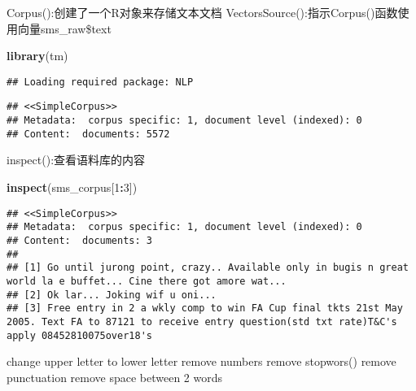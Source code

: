 \documentclass[]{article}
\newenvironment{Shaded}{\begin{snugshade}}{\end{snugshade}}
\newcommand{\KeywordTok}[1]{\textcolor[rgb]{0.13,0.29,0.53}{\textbf{#1}}}
\newcommand{\DecValTok}[1]{\textcolor[rgb]{0.00,0.00,0.81}{#1}}
\newcommand{\StringTok}[1]{\textcolor[rgb]{0.31,0.60,0.02}{#1}}
\newcommand{\OperatorTok}[1]{\textcolor[rgb]{0.81,0.36,0.00}{\textbf{#1}}}
\newcommand{\NormalTok}[1]{#1}
\begin{document}
Corpus():创建了一个R对象来存储文本文档
VectorsSource():指示Corpus()函数使用向量sms\_raw\$text

\begin{Shaded}
\begin{Highlighting}[]
\KeywordTok{library}\NormalTok{(tm)}
\end{Highlighting}
\end{Shaded}

\begin{verbatim}
## Loading required package: NLP
\end{verbatim}

\begin{Shaded}
\end{Shaded}

\begin{verbatim}
## <<SimpleCorpus>>
## Metadata:  corpus specific: 1, document level (indexed): 0
## Content:  documents: 5572
\end{verbatim}

inspect():查看语料库的内容

\begin{Shaded}
\begin{Highlighting}[]
\KeywordTok{inspect}\NormalTok{(sms_corpus[}\DecValTok{1}\OperatorTok{:}\DecValTok{3}\NormalTok{])}
\end{Highlighting}
\end{Shaded}

\begin{verbatim}
## <<SimpleCorpus>>
## Metadata:  corpus specific: 1, document level (indexed): 0
## Content:  documents: 3
## 
## [1] Go until jurong point, crazy.. Available only in bugis n great world la e buffet... Cine there got amore wat...                                            
## [2] Ok lar... Joking wif u oni...                                                                                                                              
## [3] Free entry in 2 a wkly comp to win FA Cup final tkts 21st May 2005. Text FA to 87121 to receive entry question(std txt rate)T&C's apply 08452810075over18's
\end{verbatim}

change upper letter to lower letter remove numbers remove stopwors()
remove punctuation remove space between 2 words
\end{document}
